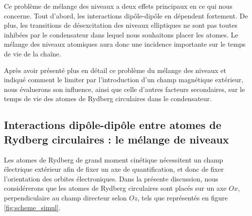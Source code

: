 Ce problème de mélange des niveaux a deux effets principaux en ce qui nous concerne.
Tout d'abord, les interactions dipôle-dipôle en dépendent fortement.
De plus, les transitions de désexcitation des niveaux elliptiques ne sont pas toutes inhibées par le condensateur dans lequel nous souhaitons placer les atomes.
Le mélange des niveaux atomiques aura donc une incidence importante sur le temps de vie de la chaîne.

Après avoir présenté plus en détail ce problème du mélange des niveaux et indiqué comment le limiter par l'introduction d'un champ magnétique extérieur, nous évaluerons son influence, ainsi que celle d'autres facteurs secondaires, sur le temps de vie des atomes de Rydberg circulaires dans le condensateur. 

\subsection{Interactions dipôle-dipôle entre atomes de Rydberg circulaires : le mélange de niveaux}
\label{subsec:circ_interactions}

\noindent Les atomes de Rydberg de grand moment cinétique nécessitent un champ électrique extérieur afin de fixer un axe de quantification, et donc de fixer l'orientation des orbites électroniques.
Dans la présente discussion, nous considérerons que les atomes de Rydberg circulaires sont placés sur un axe $Ox$, perpendiculaire au champ directeur selon $Oz$, tels que représentés en figure \eqref{fig:scheme_simul}.

